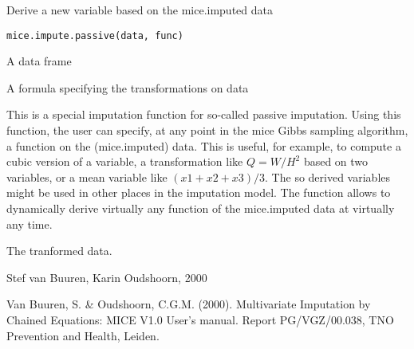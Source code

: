 \begin{Description}\relax
Derive a new variable based on the mice.imputed data
\end{Description}
\begin{Usage}
\begin{verbatim}
mice.impute.passive(data, func)
\end{verbatim}
\end{Usage}
\begin{Arguments}
\begin{ldescription}
\item[\code{data}] A data frame
\item[\code{func}] A formula specifying the transformations on data
\end{ldescription}
\end{Arguments}
\begin{Details}\relax
This is a special imputation function for so-called passive imputation.
Using this function, the user can specify, at any point in the mice 
Gibbs sampling algorithm, a function on the (mice.imputed) data. 
This is useful, for example, to compute a cubic version
of a variable, a transformation like $Q=W/H^2$ based on two variables, 
or a mean variable like $(x1+x2+x3)/3$. The so derived variables might be
used in other places in the imputation model.
The function allows to dynamically derive virtually any function 
of the mice.imputed data at virtually any time.
\end{Details}
\begin{Value}
\begin{ldescription}
\item[\code{t}] The tranformed data.
\end{ldescription}
\end{Value}
\begin{Author}\relax
Stef van Buuren, Karin Oudshoorn, 2000
\end{Author}
\begin{References}\relax
Van Buuren, S. \& Oudshoorn, C.G.M. (2000). Multivariate Imputation by Chained Equations: 
MICE V1.0 User's manual. Report PG/VGZ/00.038, TNO Prevention and Health, Leiden.
\end{References}
\begin{SeeAlso}\relax
{}
\end{SeeAlso}

